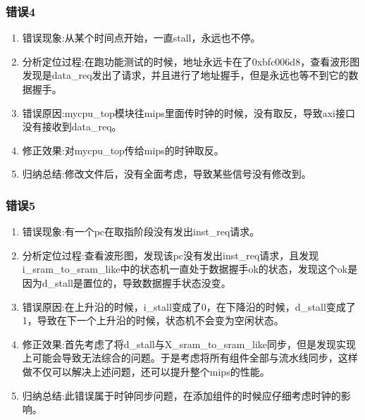\subsubsection{错误4}
\begin{enumerate}[(1)]
    \item 错误现象:从某个时间点开始，一直stall，永远也不停。
    \item 分析定位过程:在跑功能测试的时候，地址永远卡在了0xbfc006d8，查看波形图发现是data\_req发出了请求，并且进行了地址握手，但是永远也等不到它的数据握手。
    \item 错误原因:mycpu\_top模块往mips里面传时钟的时候，没有取反，导致axi接口没有接收到data\_req。
    \item 修正效果:对mycpu\_top传给mips的时钟取反。
    \item 归纳总结:修改文件后，没有全面考虑，导致某些信号没有修改到。
\end{enumerate}

\subsubsection{错误5}
\begin{enumerate}[(1)]
    \item 错误现象:有一个pc在取指阶段没有发出inst\_req请求。
    \item 分析定位过程:查看波形图，发现该pc没有发出inst\_req请求，且发现i\_sram\_to\_sram\_like中的状态机一直处于数据握手ok的状态，发现这个ok是因为d\_stall是置位的，导致数据握手状态没变。
    \item 错误原因:在上升沿的时候，i\_stall变成了0，在下降沿的时候，d\_stall变成了1，导致在下一个上升沿的时候，状态机不会变为空闲状态。
    \item 修正效果:首先考虑了将d\_stall与X\_sram\_to\_sram\_like同步，但是发现实现上可能会导致无法综合的问题。于是考虑将所有组件全部与流水线同步，这样做不仅可以解决上述问题，还可以提升整个mips的性能。
    \item 归纳总结:此错误属于时钟同步问题，在添加组件的时候应仔细考虑时钟的影响。
\end{enumerate}

